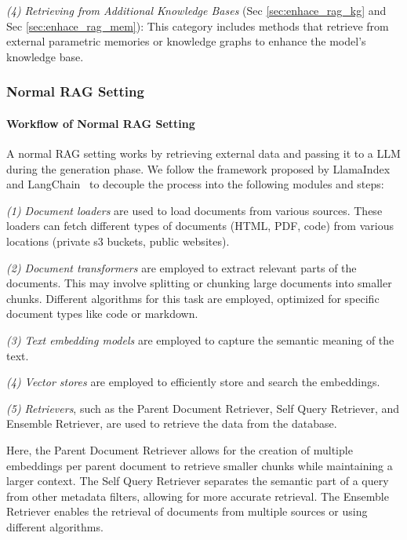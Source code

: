 \emph{(4)
Retrieving from Additional Knowledge Bases} (Sec \ref{sec:enhace_rag_kg} and Sec \ref{sec:enhace_rag_mem}):
This category includes methods that retrieve from external parametric memories \citep{chen2023purr} or knowledge graphs \citep{zhang2023mitigating} to enhance the model's knowledge base.

\subsubsection{Normal RAG Setting}
\label{sec:enhace_rag_normal}



\paragraph{Workflow of Normal RAG Setting}
A normal RAG setting works by retrieving external data and passing it to a LLM during the generation phase. We follow the framework proposed by LlamaIndex~\citep{LlamaIndex} and LangChain~\citep{LangChain} to decouple the process into the following modules and steps:


\emph{(1) Document loaders} are used to load documents from various sources. These loaders can fetch different types of documents (HTML, PDF, code) from various locations (private s3 buckets, public websites).
    
\emph{(2) Document transformers} are employed to extract relevant parts of the documents. This may involve splitting or chunking large documents into smaller chunks. Different algorithms for this task are employed, optimized for specific document types like code or markdown.

\emph{(3) Text embedding models} are employed to capture the semantic meaning of the text. 

\emph{(4) Vector stores} are employed to efficiently store and search the embeddings. 

\emph{(5) Retrievers}, such as the Parent Document Retriever, Self Query Retriever, and Ensemble Retriever, are used to retrieve the data from the database. 

Here, the Parent Document Retriever allows for the creation of multiple embeddings per parent document to retrieve smaller chunks while maintaining a larger context. The Self Query Retriever separates the semantic part of a query from other metadata filters, allowing for more accurate retrieval. The Ensemble Retriever enables the retrieval of documents from multiple sources or using different algorithms.

